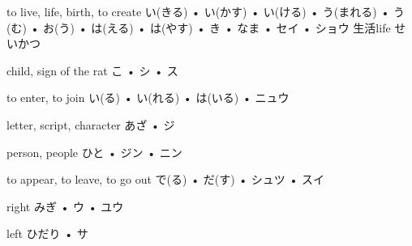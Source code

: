



\setcounter{cardnum}{49}

		{to live, life, birth, to create}
		{い(きる) • い(かす) • い(ける) • う(まれる) • う(む) • お(う) • は(える) • は(やす) • き • なま • セイ • ショウ}
		{生活}{life せいかつ}
		{}{}
		{}{}
		{}{}
		{}{}

		{child, sign of the rat}
		{こ • シ • ス}
		{}{}
		{}{}
		{}{}
		{}{}
		{}{}

		{to enter, to join}
		{い(る) • い(れる) • は(いる) • ニュウ}
		{}{}
		{}{}
		{}{}
		{}{}
		{}{}

		{letter, script, character}
		{あざ • ジ}
		{}{}
		{}{}
		{}{}
		{}{}
		{}{}

		{person, people}
		{ひと • ジン • ニン}
		{}{}
		{}{}
		{}{}
		{}{}
		{}{}

		{to appear, to leave, to go out}
		{で(る) • だ(す) • シュツ • スイ}
		{}{}
		{}{}
		{}{}
		{}{}
		{}{}

		{right}
		{みぎ • ウ • ユウ}
		{}{}
		{}{}
		{}{}
		{}{}
		{}{}

		{left}
		{ひだり • サ}
		{}{}
		{}{}
		{}{}
		{}{}
		{}{}

